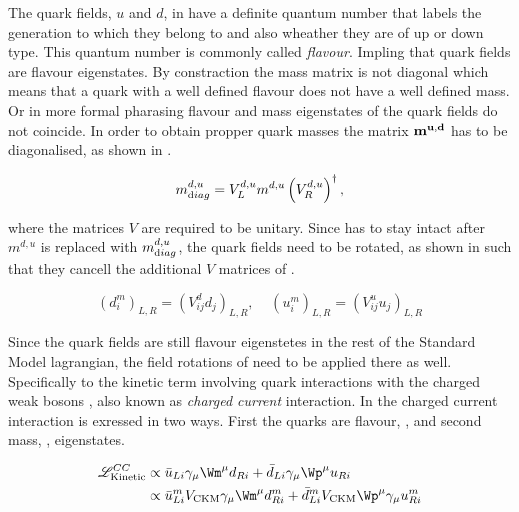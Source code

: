 The quark fields, $u$ and $d$,  in  have a definite quantum number that labels the generation to which they belong
to and also wheather they are of up or down type. This quantum number is commonly called {\it flavour}. Impling that quark fields
are flavour eigenstates. By constraction the mass matrix is not diagonal which means that
a quark with a well defined flavour does not have a well defined mass. Or in more formal pharasing flavour and mass eigenstates of
the quark fields do not coincide. In order to obtain propper quark masses the matrix $\bf m^{u,d}$ has to be diagonalised, as shown in .

\begin{equation}
  m^{d,u}_{\text diag} = V_L^{d,u} m^{d,u} \left(V_R^{d,u}\right)^{\dagger},
  \label{diagM}
\end{equation}

\noindent where the matrices $V$ are required to be unitary. Since  has to stay intact after $m^{d,u}$ is replaced with
$m^{d,u}_{\text diag}$, the quark fields need to be rotated, as shown in  such that they cancell the additional $V$ matrices
of .

\begin{equation}
  \left( d_{i}^m \right)_{L,R} = \left( V^d_{ij} d_{j} \right)_{L,R}, \;\;\;\; \left( u_{i}^m \right)_{L,R} = \left( V^u_{ij} u_{j} \right)_{L,R}
  \label{quark_rotation}
\end{equation}

\noindent Since the quark fields are still flavour eigenstetes in the rest of the Standard Model lagrangian,
the field rotations of  need to be applied there as well. Specifically
to the kinetic term involving quark interactions with the charged weak bosons \Wpm, also known as {\it charged current}
interaction. In  the charged current interaction is exressed in two ways.
First the quarks are flavour, , and second mass, , eigenstates.

\begin{subequations}
  \label{CClagrangian}
  \begin{align}
    \mathscr{L}_{\text{Kinetic}}^{CC} & \propto \bar{u}_{Li} \gamma_\mu {\Wm}^\mu d_{Ri} + \bar{d}_{Li} \gamma_\mu {\Wp}^\mu u_{Ri}  \label{CClagrangianInt} \\
                                      & \propto \bar{u}_{Li}^m  {V_{\text{CKM}}} \gamma_\mu {\Wm}^\mu d_{Ri}^m + \bar{d}_{Li}^m V_{\text{CKM}} {\Wp}^\mu \gamma_\mu u_{Ri}^m \label{CClagrangianMass}
  \end{align}
\end{subequations}


